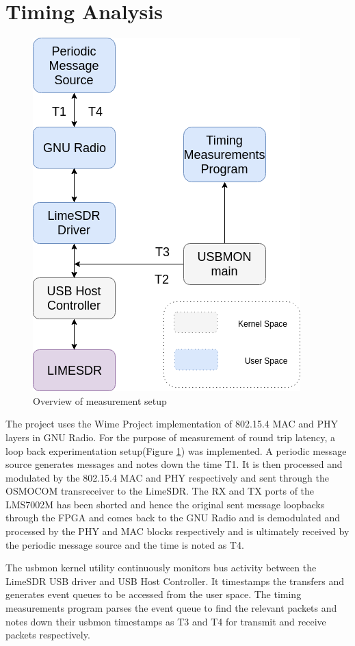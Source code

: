 \documentclass{kththesis}
\begin{document}
\section{Timing Analysis}
\begin{figure}[h!]
\centering
\includegraphics[scale=0.6]{Setup.png}
\caption{Overview of measurement setup}
\label{setup_overview}
\end{figure}
The project uses the Wime Project implementation of 802.15.4 MAC and PHY layers in GNU Radio. For the purpose of measurement of round trip latency, a loop back experimentation setup(Figure \ref{setup_overview}) was implemented. A periodic message source generates messages and notes down the time T1. It is then processed and modulated by the 802.15.4 MAC and PHY respectively and sent through the OSMOCOM transreceiver to the LimeSDR. The RX and TX ports of the LMS7002M has been shorted and hence the original sent message loopbacks through the FPGA and comes back to the GNU Radio and is demodulated and processed by the PHY and MAC blocks respectively and is ultimately received by the periodic message source and the time is noted as T4.

The usbmon kernel utility continuously monitors bus activity between the LimeSDR USB driver and USB Host Controller. It timestamps the transfers and generates event queues to be accessed from the user space. The timing measurements program parses the event queue to find the relevant packets and notes down their usbmon timestamps as T3 and T4 for transmit and receive packets respectively.  
\end{document}
